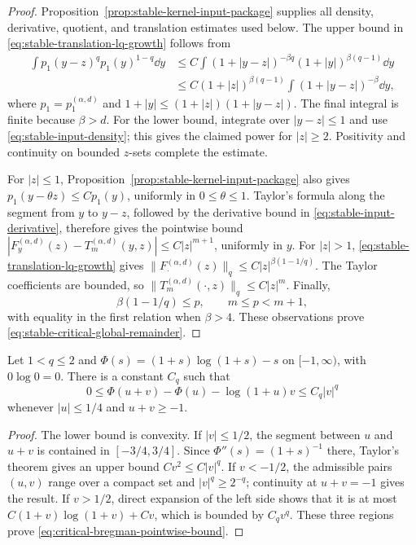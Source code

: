 \begin{proof}
Proposition~\ref{prop:stable-kernel-input-package} supplies all density,
derivative, quotient, and translation estimates used below.  The upper
bound in \eqref{eq:stable-translation-lq-growth} follows from
\[
 \begin{aligned}
 \int p_1(y-z)^q p_1(y)^{1-q}\dd y
 &\le C\int(1+|y-z|)^{-\beta q}
              (1+|y|)^{\beta(q-1)}\dd y\\
 &\le C(1+|z|)^{\beta(q-1)}
       \int(1+|y-z|)^{-\beta}\dd y,
 \end{aligned}
\]
where \(p_1=p_1^{(\alpha,d)}\) and
\(1+|y|\le(1+|z|)(1+|y-z|)\).  The final integral is finite because
\(\beta>d\).  For the lower bound, integrate over \(|y-z|\le1\) and use
\eqref{eq:stable-input-density}; this gives the claimed power
for \(|z|\ge2\).  Positivity and continuity on bounded \(z\)-sets complete
the estimate.

For \(|z|\le1\), Proposition~\ref{prop:stable-kernel-input-package} also gives
\(p_1(y-\theta z)\le C p_1(y)\), uniformly in \(0\le\theta\le1\).
Taylor's formula along the segment from \(y\) to \(y-z\), followed by the
derivative bound in \eqref{eq:stable-input-derivative}, therefore
gives the pointwise bound
\(|F_y^{(\alpha,d)}(z)-T_m^{(\alpha,d)}(y,z)|\le C|z|^{m+1}\), uniformly
in \(y\).  For \(|z|>1\), \eqref{eq:stable-translation-lq-growth} gives
\(\|F_\cdot^{(\alpha,d)}(z)\|_q\le C|z|^{\beta(1-1/q)}\).  The Taylor
coefficients are bounded, so
\(\|T_m^{(\alpha,d)}(\cdot,z)\|_q\le C|z|^m\).  Finally,
\[
 \beta(1-1/q)\le p,\qquad m\le p<m+1,
\]
with equality in the first relation when \(\beta>4\).  These observations
prove \eqref{eq:stable-critical-global-remainder}.
\end{proof}

\begin{lemma}
\label{lem:critical-lq-kl-perturbation}
Let \(1<q\le2\) and
\(\Phi(s)=(1+s)\log(1+s)-s\) on \([-1,\infty)\), with
\(0\log0=0\).  There is a constant \(C_q\) such that
\begin{equation}\label{eq:critical-bregman-pointwise-bound}
 0\le \Phi(u+v)-\Phi(u)-\log(1+u)v\le C_q|v|^q
\end{equation}
whenever \(|u|\le1/4\) and \(u+v\ge-1\).
\end{lemma}

\begin{proof}
The lower bound is convexity.  If \(|v|\le1/2\), the segment between
\(u\) and \(u+v\) is contained in \([-3/4,3/4]\).  Since
\(\Phi''(s)=(1+s)^{-1}\) there, Taylor's theorem gives an upper bound
\(C v^2\le C|v|^q\).  If \(v<-1/2\), the admissible pairs
\((u,v)\) range over a compact set and \(|v|^q\ge2^{-q}\); continuity at
\(u+v=-1\) gives the result.  If \(v>1/2\), direct expansion of the left
side shows that it is at most \(C(1+v)\log(1+v)+Cv\), which is bounded by
\(C_qv^q\).  These three regions prove
\eqref{eq:critical-bregman-pointwise-bound}.
\end{proof}


